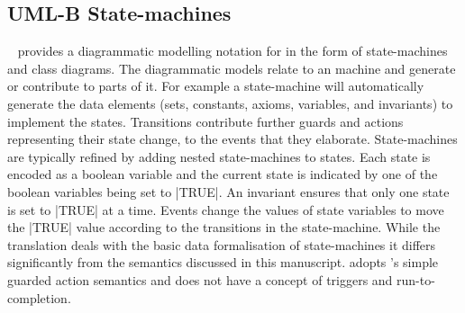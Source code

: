 
\subsection{UML-B State-machines}
\label{sec:iumlb}

\UMLB~\cite{snook06umlbTosem} provides a diagrammatic modelling notation for \EventB in the form of state-machines and class diagrams. 
The diagrammatic models relate to an \EventB machine and generate or contribute to parts of it. 
For example a state-machine will automatically generate the \EventB data elements (sets, constants, axioms, variables, and invariants) to implement the states. 
Transitions contribute further guards and actions representing their state change, to the events that they elaborate.  
State-machines are typically refined by adding nested state-machines to states.
Each state is encoded as a boolean variable and the current state is indicated by one of the boolean variables being set to |TRUE|. 
An invariant ensures that only one state is set to |TRUE| at a time.
Events change the values of state variables to move the |TRUE| value according to the transitions in the state-machine.  
While the \UMLB translation deals with the basic data formalisation of state-machines it differs 
significantly from the semantics discussed in this manuscript. 
\UMLB adopts \EventB's simple guarded action semantics and does not have a concept of triggers and run-to-completion.
